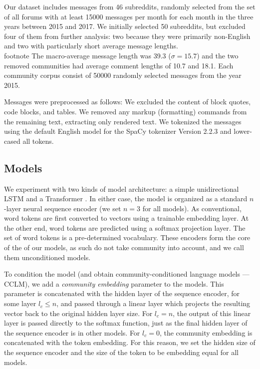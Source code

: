 \documentclass[11pt,a4paper]{article}
\begin{document}
Our dataset includes messages from \num{46} subreddits, 
randomly selected from the set of all forums 
with at least \num{15000} messages per month for each month
in the three years between 2015 and 2017. 
We initially selected \num{50} subreddits, 
but excluded four of them from further analysis: 
two because they were primarily non-English and two with particularly short average message lengths.\\footnote{
The macro-average message length was \num{39.3} ($\sigma=15.7$) and the two removed communities had average comment lengths of \num{10.7} and \num{18.1}.}
Each community corpus consist of \num{50000} randomly selected messages from the year 2015.

Messages were preprocessed as follows: 
We excluded the content of block quotes, code blocks, and tables.
We removed any markup (formatting) commands from the remaining text, extracting only rendered text.
We tokenized the messages using the default English model for the SpaCy tokenizer Version 2.2.3 \citep{Honnibal2017}
and lower-cased all tokens.

\subsection{Models}

We experiment with two kinds of model architecture: a simple
unidirectional LSTM \citep{Hochreiter1997} and a Transformer
\citep{Vaswani2017}.  In either case, the model is organized as a
standard $n$-layer neural sequence encoder (we set $n=3$ for all
models). As conventional, word tokens are first converted to vectors
using a trainable embedding layer. At the other end, word tokens are
predicted using a softmax projection layer. The set of word tokens is
a pre-determined vocabulary.  These encoders form the core of the
of our models, as such do not take community into account, and we call them
unconditioned models.

To condition the model (and obtain community-conditioned language
models --- CCLM), we add a \emph{community embedding} parameter to the
models.  This parameter is concatenated with the hidden layer of the
sequence encoder, for some layer $l_c \leq n$, and passed through a
linear layer which projects the resulting vector back to the original
hidden layer size.  For $l_c = n$, the output of this linear layer is
passed directly to the softmax function, just as the final hidden
layer of the sequence encoder is in other models.  For $l_c=0$, the
community embedding is concatenated with the token embedding.  For
this reason, we set the hidden size of the sequence encoder and the
size of the token to be embedding equal for all models.
\end{document}

